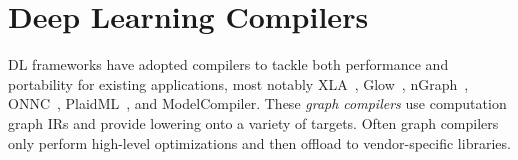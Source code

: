 

\section{Deep Learning Compilers}

DL frameworks have adopted compilers
    to tackle both performance and portability
    for existing applications, most notably
    XLA~\citep{xla}, Glow~\citep{glow}, nGraph~\citep{ngraph}, ONNC~\citep{onnc},
    PlaidML~\citep{plaidml}, and ModelCompiler.
These \textit{graph compilers} use computation graph IRs and provide
    lowering onto a variety of targets.
Often graph compilers only perform high-level optimizations
    and then offload to vendor-specific libraries.

